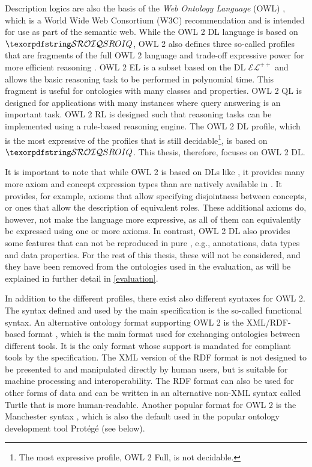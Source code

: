
Description logics are also the basis of the \emph{Web Ontology Language} (OWL) \cite{hitzler2012primer,motik2012ontology}, which is a World Wide Web Consortium (W3C) recommendation and is intended for use as part of the semantic web. While the OWL 2 DL language is based on $\SROIQ$, OWL 2 also defines three so-called profiles that are fragments of the full OWL 2 language and trade-off expressive power for more efficient reasoning \cite{motik2012profiles,motik2012ontology}. OWL 2 EL is a subset based on the DL $\mathcal{EL}^{++}$ and allows the basic reasoning task to be performed in polynomial time. This fragment is useful for ontologies with many classes and properties. OWL 2 QL is designed for applications with many instances where query answering is an important task. OWL 2 RL is designed such that reasoning tasks can be implemented using a rule-based reasoning engine. The OWL 2 DL profile, which is the most expressive of the profiles that is still decidable\footnote{The most expressive profile, OWL 2 Full, is not decidable.}, is based on $\SROIQ$. This thesis, therefore, focuses on OWL 2 DL.

It is important to note that while OWL 2 is based on DLs like \SROIQ, it provides many more axiom and concept expression types than are natively available in \SROIQ. It provides, for example, axioms that allow specifying disjointness between concepts, or ones that allow the description of equivalent roles. These additional axioms do, however, not make the language more expressive, as all of them can equivalently be expressed using one or more \SROIQ axioms. In contrast, OWL 2 DL also provides some features that can not be reproduced in pure \SROIQ, e.g., annotations, data types and data properties. For the rest of this thesis, these will not be considered, and they have been removed from the ontologies used in the evaluation, as will be explained in further detail in \cref{evaluation}.

In addition to the different profiles, there exist also different syntaxes for OWL 2. The syntax defined and used by the main specification \cite{motik2012ontology} is the so-called functional syntax. An alternative ontology format supporting OWL 2 is the XML/RDF-based format \cite{beckett2004rdf,motik2009rdf}, which is the main format used for exchanging ontologies between different tools. It is the only format whose support is mandated for compliant tools by the specification. The XML version of the RDF format is not designed to be presented to and manipulated directly by human users, but is suitable for machine processing and interoperability. The RDF format can also be used for other forms of data and can be written in an alternative non-XML syntax called Turtle \cite{beckett2008turtle} that is more human-readable. Another popular format for OWL 2 is the Manchester syntax \cite{horridge2009manchester}, which is also the default used in the popular ontology development tool Protégé (see below).

